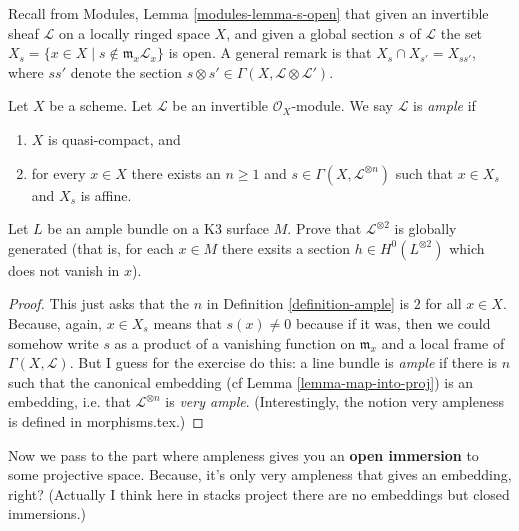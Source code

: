 Recall from Modules, Lemma \ref{modules-lemma-s-open}
that given an invertible sheaf $\mathcal{L}$ on a locally ringed
space $X$, and given a global section $s$ of $\mathcal{L}$
the set $X_s = \{x \in X \mid s \not \in \mathfrak m_x\mathcal{L}_x\}$
is open. A general remark is that
$X_s \cap X_{s'} = X_{ss'}$, where $ss'$ denote
the section $s \otimes s' \in \Gamma(X, \mathcal{L} \otimes \mathcal{L}')$.

\begin{definition}
\label{definition-ample}
\begin{reference}
\cite[II Definition 4.5.3]{EGA}
\end{reference}
Let $X$ be a scheme.
Let $\mathcal{L}$ be an invertible $\mathcal{O}_X$-module.
We say $\mathcal{L}$ is {\it ample} if
\begin{enumerate}
\item $X$ is quasi-compact, and
\item for every $x \in X$ there exists an $n \geq 1$
and $s \in \Gamma(X, \mathcal{L}^{\otimes n})$ such
that $x \in X_s$ and $X_s$ is affine.
\end{enumerate}
\end{definition}

\begin{exercise}
\label{exercise-ample-bundle-on-K3}
Let $L$ be an ample bundle on a K3 surface $M$. Prove that
$\mathcal{L}^{\otimes 2}$ is globally generated (that is, for each $x\in M$
there exsits a section $h \in H^{0}(L^{\otimes 2})$ which does not vanish in
$x$).
\end{exercise}

\begin{proof}
This just asks that the $n$ in Definition \ref{definition-ample} is $2$ for all
$x\in X$. Because, again, $x\in X_s$ means that $s(x)\neq 0$ because if it was,
then we could somehow write $s$ as a product of a vanishing function on
$\mathfrak{m}_x$ and a local frame of $\Gamma(X,\mathcal{L})$. But I guess for
the exercise do this: a line bundle is {\it ample} if there is $n$ such that the
canonical embedding (cf Lemma \ref{lemma-map-into-proj}) is an embedding, i.e.
that $\mathcal{L}^{\otimes n}$ is {\it very ample}. (Interestingly, the notion
very ampleness is defined in morphisms.tex.)
\end{proof}

Now we pass to the part where ampleness gives you an {\bf open immersion} to
some projective space. Because, it's only very ampleness that gives an
embedding, right? (Actually I think here in stacks project there are no
embeddings but closed immersions.)

